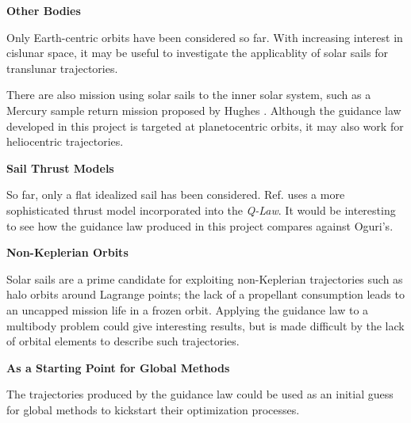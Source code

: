 \textbf{Other Bodies}

Only Earth-centric orbits have been considered so far. With increasing interest in cislunar space, it may be useful to investigate the applicablity of solar sails for translunar trajectories.

There are also mission using solar sails to the inner solar system, such as a Mercury sample return mission proposed by Hughes \cite{hughes2006sample}. Although the guidance law developed in this project is targeted at planetocentric orbits, it may also work for heliocentric trajectories.

\textbf{Sail Thrust Models}

So far, only a flat idealized sail has been considered. Ref. \cite{oguri2023solar} uses a more sophisticated thrust model incorporated into the \textit{Q-Law}. It would be interesting to see how the guidance law produced in this project compares against Oguri's.

\textbf{Non-Keplerian Orbits}

Solar sails are a prime candidate for exploiting non-Keplerian trajectories such as halo orbits around Lagrange points; the lack of a propellant consumption leads to an uncapped mission life in a frozen orbit. Applying the guidance law to a multibody problem could give interesting results, but is made difficult by the lack of orbital elements to describe such trajectories.

\textbf{As a Starting Point for Global Methods}

The trajectories produced by the guidance law could be used as an initial guess for global methods to kickstart their optimization processes.